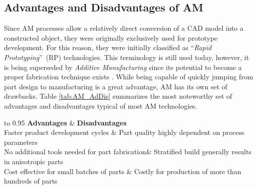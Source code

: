\documentclass[main.tex]{subfiles}
\begin{document}
\subsection{Advantages and Disadvantages of AM}\label{subsec:AMAdDis} 
Since AM processes allow a relatively direct conversion of a CAD model into a constructed object, they were originally exclusively used for prototype development. For this reason, they were initially classified as \textquotedblleft \emph{Rapid Prototyping}\textquotedblright~(RP) technologies. This terminology is still used today, however, it is being superseded by \emph{Additive Manufacturing} since its potential to become a proper fabrication technique exists \cite{Gibson2015}. While being capable of quickly jumping from part design to manufacturing is a great advantage, AM has its own set of drawbacks. Table \ref{tab:AM_AdDis} summarizes the most noteworthy set of advantages and disadvantages typical of most AM technologies.

\begin{table}[h]
	\centering
	\caption{Advantages and Disadvantages of Additive Manufacturing}
	\label{tab:AM_AdDis}
	\begin{tabu} to 0.95\textwidth {  X[c]  X[c] }
		\hline
		\textbf{Advantages} & \textbf{Disadvantages} \\ 
		\hline
		Faster product development cycles \cite{Gibson2015} & Part quality highly dependent on process parameters \cite{Gibson2015}\\
		No additional tools needed for part fabrication\cite{Gibson2015}&  Stratified build generally results in anisotropic parts \cite{Gibson2015, Capote2017}\\
		Cost effective for small batches of parts \cite{Baumers2016,Conner2014,Berman2012}&  Costly for production of more than hundreds of parts \cite{Baumers2016,Conner2014,Berman2012}\\
		\hline
	\end{tabu}
\end{table}   
\end{document}
